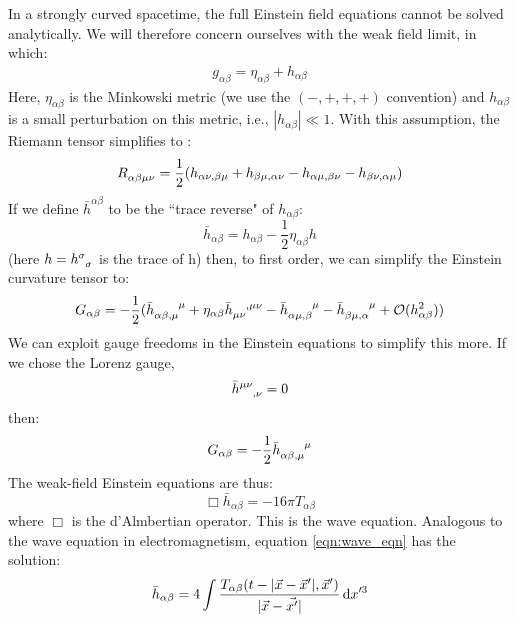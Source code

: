 In a strongly curved spacetime, the full Einstein field equations cannot be solved analytically. We will therefore concern ourselves with the weak field limit, in which:
\begin{align}
g_{\alpha\beta} = \eta_{\alpha\beta} + h_{\alpha\beta}
\end{align}
Here, $\eta_{\alpha\beta}$ is the Minkowski metric (we use the $(-,+,+,+)$ convention) and $h_{\alpha\beta}$ is a small perturbation on this metric, i.e., $|h_{\alpha\beta}| \ll 1$. With this assumption, the Riemann tensor simplifies to \cite{ref:Schutz}:
\begin{equation}
R\indices{_{\alpha\beta\mu\nu}} = \frac{1}{2}(h_{\alpha\nu,\beta\mu} + h_{\beta\mu,\alpha\nu} - h_{\alpha\mu,\beta\nu} - h_{\beta\nu,\alpha\mu})
\end{equation}
If we define $\bar{h}^{\alpha\beta}$ to be the ``trace reverse" of $h_{\alpha\beta}$:
\begin{equation}
\bar{h}_{\alpha\beta} = h_{\alpha\beta} - \frac{1}{2}\eta_{\alpha\beta}h
\end{equation}
(here $h = h\indices{^\sigma_\sigma}$ is the trace of h) then, to first order, we can simplify the Einstein curvature tensor to:
\begin{equation}
G_{\alpha\beta} = -\frac{1}{2}(\bar{h}\indices{_{\alpha\beta,\mu}^\mu} + \eta_{\alpha\beta}\bar{h}\indices{_{\mu\nu}^{,\mu\nu}} - \bar{h}\indices{_{\alpha\mu,\beta}^\mu} - \bar{h}\indices{_{\beta\mu,\alpha}^\mu} + \mathcal{O}(h^2_{\alpha\beta}))
\end{equation}
We can exploit gauge freedoms in the Einstein equations to simplify this more. If we chose the Lorenz gauge,
\begin{equation}
\bar{h}\indices{^{\mu\nu}_{,\nu}} = 0
\end{equation}
then:
\begin{equation}
G_{\alpha\beta} = -\frac{1}{2}\bar{h}\indices{_{\alpha\beta,\mu}^\mu}
\end{equation}
The weak-field Einstein equations are thus:
\begin{equation}
\label{eqn:wave_eqn}
\Box\bar{h}_{\alpha\beta} = -16\pi T_{\alpha\beta}
\end{equation}
where $\Box$ is the d'Almbertian operator. This is the wave equation. Analogous to the wave equation in electromagnetism, equation \ref{eqn:wave_eqn} has the solution:
\begin{equation}
\label{eqn:wave_sol-source}
\bar{h}_{\alpha\beta} = 4 \int \frac{T_{\alpha\beta}(t - |\vec{x}-\vec{x}'|, \vec{x}')}{|\vec{x} - \vec{x'}|} \d x'^3
\end{equation}

